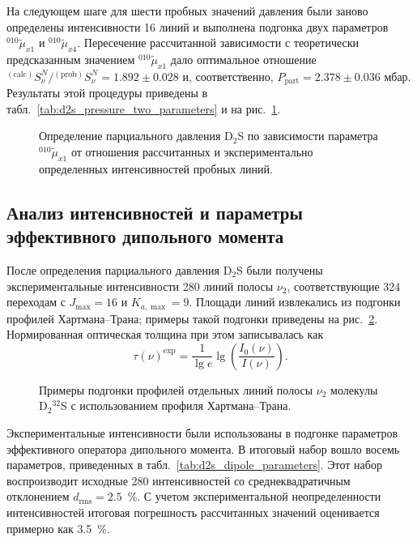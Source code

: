 На следующем шаге для шести пробных значений давления были заново определены интенсивности 16 линий и
выполнена подгонка двух параметров ${}^{010}\widetilde{\mu}_{x1}$ и
${}^{010}\widetilde{\mu}_{x4}$. Пересечение рассчитанной зависимости с теоретически предсказанным
значением ${}^{010}\widetilde{\mu}_{x1}$ дало оптимальное отношение
${}^{(\text{calc})}S^N_{\nu}/{}^{(\text{prob})}S^N_{\nu}=1.892\pm0.028$ и, соответственно,
$P_{\text{part}}=2.378\pm0.036$ мбар. Результаты этой процедуры приведены в
табл.~\ref{tab:d2s_pressure_two_parameters} и на рис.~\ref{fig:d2s_pressure}.



\begin{figure}[htbp]
    \centering
    \caption{Определение парциального давления D$_2$S по зависимости параметра
    ${}^{010}\widetilde{\mu}_{x1}$ от отношения рассчитанных и экспериментально определенных
    интенсивностей пробных линий.}
    \label{fig:d2s_pressure}
\end{figure}

\subsection{Анализ интенсивностей и параметры эффективного дипольного момента}

После определения парциального давления D$_2$S были получены экспериментальные интенсивности 280 линий
полосы $\nu_2$, соответствующие 324 переходам с $J_{\max}=16$ и $K_{a,\max}=9$. Площади линий
извлекались из подгонки профилей Хартмана--Трана; примеры такой подгонки приведены на
рис.~\ref{fig:d2s_lineshape}. Нормированная оптическая толщина при этом записывалась как
\begin{equation}
\tau(\nu)^{\textrm{exp}}=\frac{1}{\lg e}\lg\left(\frac{I_0(\nu)}{I(\nu)}\right).
\label{eq:d2s_tau}
\end{equation}

\begin{figure}[htbp]
    \centering
    \caption{Примеры подгонки профилей отдельных линий полосы $\nu_2$ молекулы D$_2{}^{32}$S с
    использованием профиля Хартмана--Трана.}
    \label{fig:d2s_lineshape}
\end{figure}

Экспериментальные интенсивности были использованы в подгонке параметров эффективного оператора
дипольного момента. В итоговый набор вошло восемь параметров, приведенных в
табл.~\ref{tab:d2s_dipole_parameters}. Этот набор воспроизводит исходные 280 интенсивностей со
среднеквадратичным отклонением $d_{\textrm{rms}}=2.5$~\%. С учетом экспериментальной неопределенности
интенсивностей итоговая погрешность рассчитанных значений оценивается примерно как 3.5~\%.

